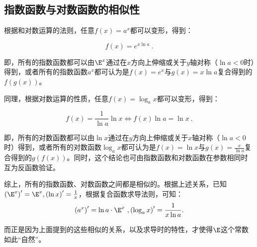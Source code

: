 \subsection{指数函数与对数函数的相似性}\label{sub_Ln_1}


根据和对数运算的法则，任意$f(x)=a^x$都可以变形，得到：

\begin{equation}
f(x)=e^{x\ln a}~.
\end{equation}

即，所有的指数函数都可以由$\E^x$通过在$x$方向上伸缩或关于$y$轴对称（$\ln a<0$时）得到，或者所有的指数函数$a^x$都可认为是$f(x)=e^x$与$g(x)=x\ln a$复合得到的$f(g(x))$。

同理，根据对数运算的性质，任意$f(x)=\log_ax$都可以变形，得到：

\begin{equation}
f(x)=\frac{1}{\ln a}\ln x\iff f(x)\ln a=\ln x~.
\end{equation}

即，所有的对数函数都可以由$\ln x$通过在$y$方向上伸缩或关于$x$轴对称（$\ln a<0$时）得到，或者所有的对数函数$\log_ax$都可认为是$f(x)=\ln x$与$\displaystyle g(x)=\frac{x}{\ln a}$复合得到的$g(f(x))$。同时，这个结论也可由指数函数和对数函数在参数相同时互为反函数验证。

综上，所有的指数函数、对数函数之间都是相似的。根据上述关系，已知$\left(\E^x\right)'=\E^x,\left(\ln x\right)'=\frac{1}{x}$，根据复合函数求导法则，可知：
\begin{equation}
\left(a^x\right)'=\ln a\cdot\E^x~,\left(\log_a x\right)'=\frac{1}{x\ln a}.
\end{equation}

而正是因为上面提到的这些相似的关系，以及求导时的特性，才使得$\E$这个常数如此“自然”。
